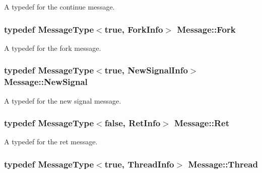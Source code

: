 A typedef for the continue message. 

\subsubsection[{\texorpdfstring{Fork}{Fork}}]{\setlength{\rightskip}{0pt plus 5cm}typedef {\bf Message\+Type}$<$true, {\bf Fork\+Info}$>$ {\bf Message\+::\+Fork}}\hypertarget{class_message_ad1eca09e5cd0c92f940f51b847dd7f14}{}\label{class_message_ad1eca09e5cd0c92f940f51b847dd7f14}


A typedef for the fork message. 

\subsubsection[{\texorpdfstring{New\+Signal}{NewSignal}}]{\setlength{\rightskip}{0pt plus 5cm}typedef {\bf Message\+Type}$<$true, {\bf New\+Signal\+Info}$>$ {\bf Message\+::\+New\+Signal}}\hypertarget{class_message_a1b5e44c60a29dd5a935dc354cfa94284}{}\label{class_message_a1b5e44c60a29dd5a935dc354cfa94284}


A typedef for the new signal message. 

\subsubsection[{\texorpdfstring{Ret}{Ret}}]{\setlength{\rightskip}{0pt plus 5cm}typedef {\bf Message\+Type}$<$false, {\bf Ret\+Info}$>$ {\bf Message\+::\+Ret}}\hypertarget{class_message_a146628035f5a0723cb04f7a328858e34}{}\label{class_message_a146628035f5a0723cb04f7a328858e34}


A typedef for the ret message. 

\subsubsection[{\texorpdfstring{Thread}{Thread}}]{\setlength{\rightskip}{0pt plus 5cm}typedef {\bf Message\+Type}$<$true, {\bf Thread\+Info}$>$ {\bf Message\+::\+Thread}}\hypertarget{class_message_ad3f3fae0323770c88017fc75b50682d1}{}\label{class_message_ad3f3fae0323770c88017fc75b50682d1}


